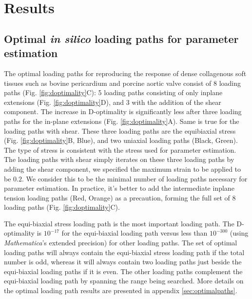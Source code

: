 \section{Results}


\subsection{Optimal \textit{in silico} loading paths for parameter estimation}

	The optimal loading paths for reproducing the response of dense collagenous soft tissues such as bovine pericardium and porcine aortic valve consist of 8 loading paths (Fig. \ref{fig:doptimality}C): 5 loading paths consisting of only inplane extensions (Fig. \ref{fig:doptimality}D), and 3 with the addition of the shear component. The increase in D-optimality is significantly less after three loading paths for the in-plane extensions (Fig. \ref{fig:doptimality}A). Same is true for the loading paths with shear. These three loading paths are the equibiaxial stress (Fig. \ref{fig:doptimality}B, Blue), and two uniaxial loading paths (Black, Green). The type of stress is consistent with the stress used for parameter estimation. The loading paths with shear simply iterates on these three loading paths by adding the shear component, we specified the maximum strain to be applied to be $0.2$. We consider this to be the minimal number of loading paths necessary for parameter estimation. In practice, it's better to add the intermediate inplane tension loading paths (Red, Orange) as a precaution, forming the full set of 8 loading paths (Fig. \ref{fig:doptimality}C). 
	
	
	The equi-biaxial stress loading path is the most important loading path. The D-optimality is $10^{-17}$ for the equi-biaxial loading path versus less than $10^{-300}$ (using \textit{Mathematica}'s extended precision) for other loading paths. The set of optimal loading paths will always contain the equi-biaxial stress loading path if the total number is odd, whereas it will always contain two loading paths just beside the equi-biaxial loading paths if it is even. The other loading paths complement the equi-biaxial loading path by spanning the range being searched. More details on the optimal loading path results are presented in appendix \ref{sec:optimalpaths}.
	
